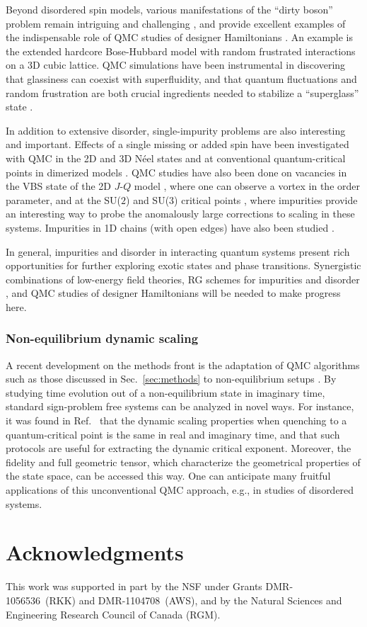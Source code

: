 \documentclass[10pt,pre,aps,twocolumn,showpacs,superscriptaddress,floatfix]{revtex4-1}
\begin{document}
Beyond disordered spin models, various manifestations of the ``dirty boson'' problem remain intriguing and challenging \cite{Pollet09,Meier12,Iyer12}, and provide 
excellent examples of the indispensable role of QMC studies of designer Hamiltonians \cite{Gurarie09}. An example is the extended hardcore Bose-Hubbard model with 
random frustrated interactions on a 3D cubic lattice. QMC simulations have been instrumental in discovering that glassiness can coexist with superfluidity, 
and that quantum fluctuations and random frustration are both crucial ingredients needed to stabilize a ``superglass'' state \cite{superglass1,superglass2}.

In addition to extensive disorder, single-impurity problems are also interesting and important. Effects of a single missing or added spin have been
investigated with QMC in the 2D and 3D N\'eel states \cite{Hoglund04,Liu09} and at conventional quantum-critical points in dimerized models \cite{Hoglund07}. 
QMC studies have also been done on vacancies in the VBS state of the 2D $J$-$Q$ model \cite{Kaul08}, where one can observe a vortex in the order parameter, 
and at the SU($2$) and SU($3$) critical points \cite{banerjee2010:log,banerjee2010:su3}, where impurities provide an interesting way to probe the anomalously 
large corrections to scaling in these systems. Impurities in 1D chains (with open edges) have also been studied \cite{Sanyal11}.

In general, impurities and disorder in interacting quantum systems present rich opportunities for further exploring exotic states and phase transitions.
Synergistic combinations of low-energy field theories, RG schemes for impurities \cite{Vojta12} and disorder \cite{Hoyos08,Vojta10,Altman10,Iyer12}, 
and QMC studies of designer Hamiltonians will be needed to make progress here.

\subsubsection{Non-equilibrium dynamic scaling}

A recent development on the methods front is the adaptation of QMC algorithms such as those discussed in Sec.~\ref{sec:methods} to non-equilibrium 
setups \cite{Degrandi11}. By studying time evolution out of a non-equilibrium state in imaginary time, standard sign-problem free systems
can be analyzed in novel ways. For instance, it was found in Ref.~\cite{Degrandi11} that the dynamic scaling properties when quenching to
a quantum-critical point is the same in real and imaginary time, and that such protocols are useful for extracting the dynamic critical
exponent. Moreover, the fidelity and full geometric tensor, which characterize the geometrical properties of the state space, can be
accessed this way. One can anticipate many fruitful applications of this unconventional QMC approach, e.g., in studies of disordered systems.

\section*{Acknowledgments}

This work was supported in part by the NSF under Grants DMR-1056536~(RKK) and DMR-1104708~(AWS), and by the Natural Sciences and Engineering Research Council of Canada (RGM).


\end{document}
